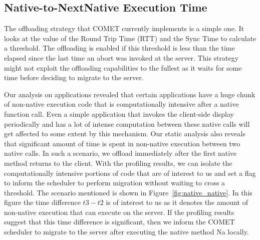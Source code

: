 \subsection{Native-to-NextNative Execution Time}
The offloading strategy that COMET currently implements is a simple one. It looks at the value of the Round Trip Time (RTT) and
the Sync Time to calculate a threshold. The offloading is enabled if this threshold is less than the time elapsed since the last
time an abort was invoked at the server. This strategy might not exploit the offloading capabilities to the fullest as it waits for
some time before deciding to migrate to the server.

Our analysis on applications revealed that certain applications have a huge chunk of non-native execution code that is computationally
intensive after a native function call. Even a simple application that invokes the client-side display periodically and has a lot of intense
computation between these native calls will get affected to some extent by this mechanism. Our static analysis also reveals that significant
amount of time is spent in non-native execution between two native calls. In such a scenario, we offload immediately after the first
native method returns to the client. With the profiling results, we can isolate the computationally intensive portions of code that
are of interest to us and set a flag to inform the scheduler to perform migration without waiting to cross a threshold. The scenario
mentioned is shown in Figure~\ref{fig:native_native}. In this figure the time difference $t3-t2$ is of interest to us as it denotes the amount
of non-native execution that can execute on the server. If the profiling results suggest that this time difference is significant, then we
inform the COMET scheduler to migrate to the server after executing the native method Na locally.

